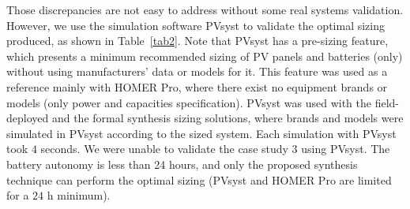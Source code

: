 \documentclass[10pt,journal,compsoc]{IEEEtran}
\begin{document}
Those discrepancies are not easy to address without some real systems validation. However, we use the simulation software PVsyst to validate the optimal sizing produced, as shown in Table~\ref{tab2}. Note that PVsyst has a pre-sizing feature, which presents a minimum recommended sizing of PV panels and batteries (only) without using manufacturers' data or models for it. This feature was used as a reference mainly with HOMER Pro, where there exist no equipment brands or models (only power and capacities specification). PVsyst was used with the field-deployed and the formal synthesis sizing solutions, where brands and models were simulated in PVsyst according to the sized system. Each simulation with PVsyst took $4$ seconds. We were unable to validate the case study $3$ using PVsyst. The battery autonomy is less than 24 hours, and only the proposed synthesis technique can perform the optimal sizing (PVsyst and HOMER Pro are limited for a $24$ h minimum).
%
\end{document}

